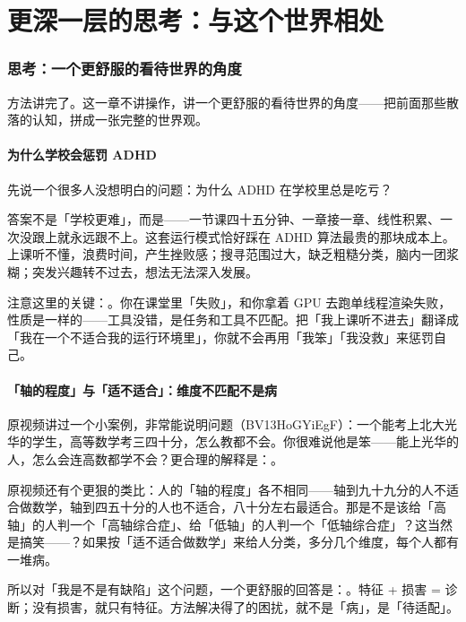 \part{更深一层的思考：与这个世界相处}

\section{思考：一个更舒服的看待世界的角度}

方法讲完了。这一章不讲操作，讲一个更舒服的看待世界的角度——把前面那些散落的认知，拼成一张完整的世界观。

\subsection{为什么学校会惩罚 ADHD}

先说一个很多人没想明白的问题：为什么 ADHD 在学校里总是吃亏？

答案不是「学校更难」，而是——一节课四十五分钟、一章接一章、线性积累、一次没跟上就永远跟不上。这套运行模式恰好踩在 ADHD 算法最贵的那块成本上。上课听不懂，浪费时间，产生挫败感；搜寻范围过大，缺乏粗糙分类，脑内一团浆糊；突发兴趣转不过去，想法无法深入发展。

\begin{insight}
注意这里的关键：。你在课堂里「失败」，和你拿着 GPU 去跑单线程渲染失败，性质是一样的——工具没错，是任务和工具不匹配。把「我上课听不进去」翻译成「我在一个不适合我的运行环境里」，你就不会再用「我笨」「我没救」来惩罚自己。
\end{insight}

\subsection{「轴的程度」与「适不适合」：维度不匹配不是病}

原视频讲过一个小案例，非常能说明问题（BV13HoGYiEgF）：一个能考上北大光华的学生，高等数学考三四十分，怎么教都不会。你很难说他是笨——能上光华的人，怎么会连高数都学不会？更合理的解释是：。

原视频还有个更狠的类比：人的「轴的程度」各不相同——轴到九十九分的人不适合做数学，轴到四五十分的人也不适合，八十分左右最适合。那是不是该给「高轴」的人判一个「高轴综合症」、给「低轴」的人判一个「低轴综合症」？这当然是搞笑——？如果按「适不适合做数学」来给人分类，多分几个维度，每个人都有一堆病。

所以对「我是不是有缺陷」这个问题，一个更舒服的回答是：。特征 + 损害 = 诊断；没有损害，就只有特征。方法解决得了的困扰，就不是「病」，是「待适配」。

